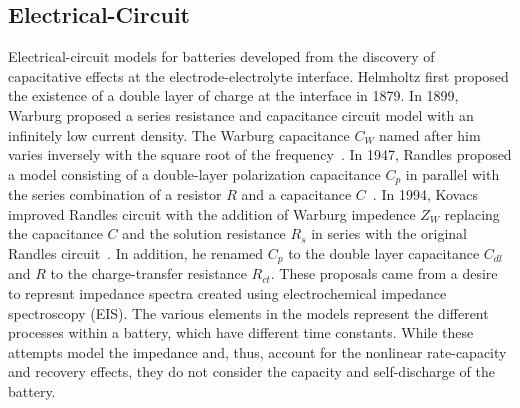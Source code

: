 \documentclass[../zhang_thesis.tex]{subfiles}
\begin{document}
\subsection{Electrical-Circuit}

Electrical-circuit models for batteries developed from the discovery of capacitative effects at the electrode-electrolyte interface. Helmholtz first proposed the existence of a double layer of charge at the interface in 1879. In 1899, Warburg proposed a series resistance and capacitance circuit model with an infinitely low current density. The Warburg capacitance $C_W$ named after him varies inversely with the square root of the frequency~\cite{geddes97}. In 1947, Randles proposed a model
consisting of a double-layer polarization capacitance $C_p$ in parallel with the series combination of a resistor $R$ and a capacitance $C$~\cite{randles47}. In 1994, Kovacs improved Randles circuit with the addition of Warburg impedence $Z_W$ replacing the capacitance $C$ and the solution resistance $R_s$ in series with the original Randles circuit~\cite{kovacs95}. In addition, he renamed $C_p$ to the double layer capacitance $C_{dl}$ and $R$ to the charge-transfer resistance
$R_{ct}$. These proposals came from a desire to represnt impedance spectra created using electrochemical impedance spectroscopy (EIS). The various elements in the models represent the different processes within a battery, which have different time constants. While these attempts model the impedance and, thus, account for the nonlinear rate-capacity and recovery effects, they do not consider the capacity and self-discharge of the battery.

\end{document}
